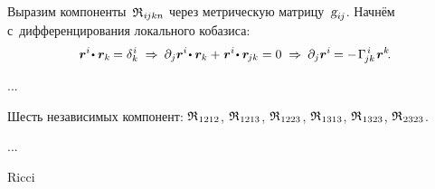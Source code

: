 \begin{otherlanguage}{russian}
Выразим компоненты~${\mathfrak{R}_{\hspace{.1ex}i\hspace{-0.1ex}jkn}}$ через метрическую матрицу~${\textsl{g}_{i\hspace{-0.1ex}j}}$. Начнём с~дифференцирования локального кобазиса:
\[ \bm{r}^i \hspace{-0.32ex} \dotp \bm{r}_k \hspace{-0.16ex} = \delta_k^{\hspace{0.1ex}i} \;\Rightarrow\:
\partial_j \bm{r}^i \hspace{-0.32ex} \dotp \bm{r}_k + \hspace{.1ex} \bm{r}^i \hspace{-0.32ex} \dotp \bm{r}_{\hspace{-0.2ex}jk} = 0 \;\Rightarrow\:
\partial_j \bm{r}^i \hspace{-0.12ex} = - \hspace{.2ex} \Gamma_{\hspace{-0.25ex}jk}^{\hspace{.25ex}i} \hspace{.2ex} \bm{r}^k
\hspace{-0.4ex}. \]

...

Шесть независимых компонент:
${\mathfrak{R}_{\hspace{.1ex}1212}}$, ${\mathfrak{R}_{\hspace{.1ex}1213}}$, ${\mathfrak{R}_{\hspace{.1ex}1223}}$, ${\mathfrak{R}_{\hspace{.1ex}1313}}$, ${\mathfrak{R}_{\hspace{.1ex}1323}}$, ${\mathfrak{R}_{\hspace{.1ex}2323}}$.

...

  Ricci


\end{otherlanguage}
